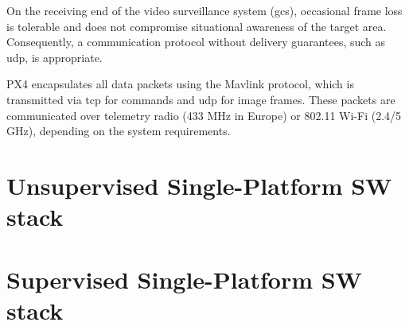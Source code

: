 On the receiving end of the video surveillance system (\gls{gcs}), occasional frame loss is tolerable and does not compromise situational awareness of the target area. Consequently, a communication protocol without delivery guarantees, such as \gls{udp}, is appropriate.

PX4 encapsulates all data packets using the Mavlink protocol, which is
transmitted via \gls{tcp} for commands and \gls{udp} for image frames. These
packets are communicated over telemetry radio (433 MHz in Europe) or 802.11
Wi-Fi (2.4/5 GHz), depending on the system requirements.



\section{Unsupervised Single-Platform SW stack}
\label{sec:unsuperv-stack}

\section{Supervised Single-Platform SW stack}
\label{sec:superv-stack}




